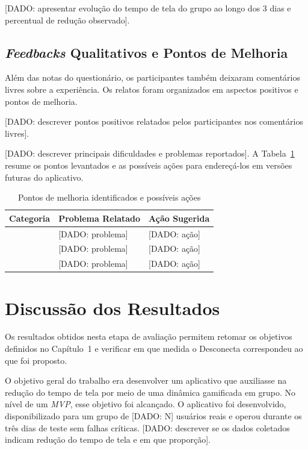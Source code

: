 [DADO: apresentar evolução do tempo de tela do grupo ao longo dos 3 dias e percentual de redução observado].

\subsection{\textit{Feedbacks} Qualitativos e Pontos de Melhoria}

Além das notas do questionário, os participantes também deixaram comentários livres sobre a experiência. Os relatos foram organizados em aspectos positivos e pontos de melhoria.

[DADO: descrever pontos positivos relatados pelos participantes nos comentários livres].

[DADO: descrever principais dificuldades e problemas reportados]. A Tabela~\ref{tab:pontos-melhoria} resume os pontos levantados e as possíveis ações para endereçá-los em versões futuras do aplicativo.

\begin{table}[htbp]
\centering
\caption{Pontos de melhoria identificados e possíveis ações}
\label{tab:pontos-melhoria}
\begin{tabularx}{\textwidth}{|l|X|X|}
\hline
\rowcolor{verdeclaro}
\textbf{Categoria} & \textbf{Problema Relatado} & \textbf{Ação Sugerida} \\ \hline
[DADO: categoria] & [DADO: problema] & [DADO: ação] \\ \hline
[DADO: categoria] & [DADO: problema] & [DADO: ação] \\ \hline
[DADO: categoria] & [DADO: problema] & [DADO: ação] \\ \hline
\end{tabularx}
\end{table}

\section{Discussão dos Resultados}

Os resultados obtidos nesta etapa de avaliação permitem retomar os objetivos definidos no Capítulo~1 e verificar em que medida o Desconecta correspondeu ao que foi proposto.

O objetivo geral do trabalho era desenvolver um aplicativo que auxiliasse na redução do tempo de tela por meio de uma dinâmica gamificada em grupo. No nível de um \textit{MVP}, esse objetivo foi alcançado. O aplicativo foi desenvolvido, disponibilizado para um grupo de [DADO: N] usuários reais e operou durante os três dias de teste sem falhas críticas. [DADO: descrever se os dados coletados indicam redução do tempo de tela e em que proporção].

